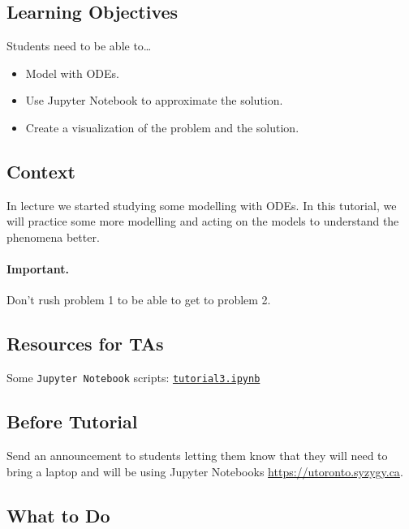 \subsection*{Learning Objectives}
	Students need to be able to\ldots
	\begin{itemize}
		\item Model with ODEs. \\[-20pt]
		\item Use Jupyter Notebook to approximate the solution. \\[-20pt]
		\item Create a visualization of the problem and the solution.
	\end{itemize}

\subsection*{Context}
	
In lecture we started studying some modelling with ODEs. 
In this tutorial, we will practice some more modelling and acting on the models to understand the phenomena better.


\paragraph{Important.} Don't rush problem 1 to be able to get to problem 2. 


\subsection*{Resources for TAs}

Some \texttt{Jupyter Notebook} scripts:
	\href{https://utoronto.syzygy.ca/jupyter/user-redirect/git-pull?repo=https://github.com/bigfatbernie/IBLMathModeling&subPath=tutorials/tutorial3/tutorial3.ipynb}{\tt tutorial3.ipynb}


\subsection*{Before Tutorial}

Send an announcement to students letting them know that they will need to bring a laptop and will be using Jupyter Notebooks \url{https://utoronto.syzygy.ca}.


\subsection*{What to Do}
	
